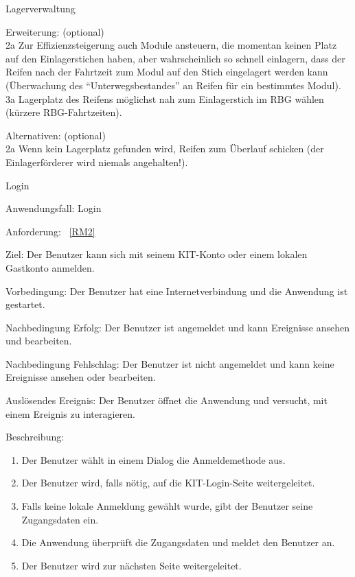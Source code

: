 \begin{function}{10}{Lagerverwaltung}
\begin{enumerate}
    \end{enumerate}
    \item[Erweiterung:] (optional)\\
        2a Zur Effizienzsteigerung auch Module ansteuern, die momentan keinen Platz auf
        den Einlagerstichen haben, aber wahrscheinlich so schnell einlagern, dass der
        Reifen nach der Fahrtzeit zum Modul auf den Stich eingelagert werden kann
        (Überwachung des "`Unterwegsbestandes"' an Reifen für ein bestimmtes
        Modul).\\
        3a Lagerplatz des Reifens möglichst nah zum Einlagerstich im RBG wählen	(kürzere RBG-Fahrtzeiten).
    \item[Alternativen:] (optional)\\
        2a Wenn kein Lagerplatz gefunden wird, Reifen zum Überlauf schicken (der
        Einlagerförderer wird niemals angehalten!).
\end{function}
\fi

\begin{function}{10}{Login}
    \item[Anwendungsfall:] Login
    \item[Anforderung:]~\ref{RM2}
    \item[Ziel:] Der Benutzer kann sich mit seinem KIT-Konto oder einem lokalen Gastkonto anmelden.
    \item[Vorbedingung:] Der Benutzer hat eine Internetverbindung und die Anwendung ist gestartet.
    \item[Nachbedingung Erfolg:] Der Benutzer ist angemeldet und kann Ereignisse ansehen und bearbeiten.
    \item[Nachbedingung Fehlschlag:] Der Benutzer ist nicht angemeldet und kann keine Ereignisse ansehen oder bearbeiten.
    \item[Auslösendes Ereignis:] Der Benutzer öffnet die Anwendung und versucht, mit einem Ereignis zu interagieren.
    \item[Beschreibung:] ~
    \begin{enumerate}
        \item Der Benutzer wählt in einem Dialog die Anmeldemethode aus.
        \item Der Benutzer wird, falls nötig, auf die KIT-Login-Seite weitergeleitet.
        \item Falls keine lokale Anmeldung gewählt wurde, gibt der Benutzer seine Zugangsdaten ein.
        \item Die Anwendung überprüft die Zugangsdaten und meldet den Benutzer an.
        \item Der Benutzer wird zur nächsten Seite weitergeleitet.
    \end{enumerate}
\end{function}

